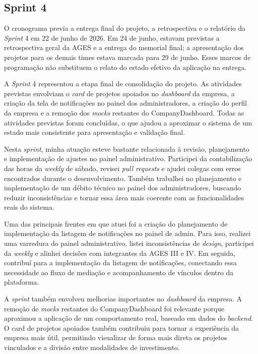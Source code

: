 \clearpage
\subsection{Sprint 4}

O cronograma previa a entrega final do projeto, a retrospectiva e o relatório da \textit{Sprint} 4 em 22 de junho de 2026. Em 24 de junho, estavam previstas a retrospectiva geral da \ac{AGES} e a entrega do memorial final; a apresentação dos projetos para os demais times estava marcada para 29 de junho. Esses marcos de programação não substituem o relato do estado efetivo da aplicação na entrega.

A \textit{Sprint} 4 representou a etapa final de consolidação do projeto. As atividades previstas envolviam o \textit{card} de projetos apoiados no \textit{dashboard} da empresa, a criação da tela de notificações no painel dos administradores, a criação do perfil da empresa e a remoção dos \textit{mocks} restantes do CompanyDashboard. Todas as atividades previstas foram concluídas, o que ajudou a aproximar o sistema de um estado mais consistente para apresentação e validação final.

Nesta \textit{sprint}, minha atuação esteve bastante relacionada à revisão, planejamento e implementação de ajustes no painel administrativo. Participei da contabilização das horas da \textit{weekly} de sábado, revisei \textit{pull requests} e ajudei colegas com erros encontrados durante o desenvolvimento. Também trabalhei no planejamento e implementação de um débito técnico no painel dos administradores, buscando reduzir inconsistências e tornar essa área mais coerente com as funcionalidades reais do sistema.

Uma das principais frentes em que atuei foi a criação do planejamento de implementação da listagem de notificações no painel de admin. Para isso, realizei uma varredura do painel administrativo, listei inconsistências de \textit{design}, participei da \textit{weekly} e alinhei decisões com integrantes da \ac{AGES} III e IV. Em seguida, contribuí para a implementação da listagem de notificações, conectando essa necessidade ao fluxo de mediação e acompanhamento de vínculos dentro da plataforma.

A \textit{sprint} também envolveu melhorias importantes no \textit{dashboard} da empresa. A remoção de \textit{mocks} restantes do CompanyDashboard foi relevante porque aproximou a aplicação de um comportamento real, baseado em dados do \textit{backend}. O card de projetos apoiados também contribuiu para tornar a experiência da empresa mais útil, permitindo visualizar de forma mais direta os projetos vinculados e a divisão entre modalidades de investimento.

